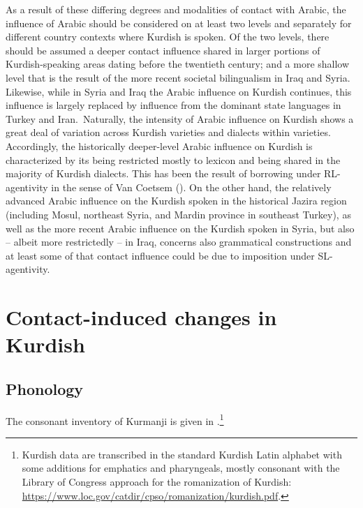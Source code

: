 \documentclass[output=paper]{langsci/langscibook}
\begin{document}
As a result of these differing degrees and modalities of contact with Arabic, the influence of Arabic should be considered on at least two levels and separately for different country contexts where Kurdish is spoken. Of the two levels, there should be assumed a deeper contact influence shared in larger portions of Kurdish-speaking areas dating before the twentieth century; and a more shallow level that is the result of the more recent societal bilingualism in Iraq and Syria. Likewise, while in Syria and Iraq the Arabic influence on Kurdish continues, this influence is largely replaced by influence from the dominant state languages in Turkey and Iran.~Naturally, the intensity of Arabic influence on Kurdish shows a great deal of variation across Kurdish varieties and dialects within varieties. Accordingly, the historically deeper-level Arabic influence on Kurdish is characterized by its being restricted mostly to lexicon and being shared in the majority of Kurdish dialects. This has been the result of borrowing under RL-agentivity in the sense of Van Coetsem (\citeyear{VanCoetsem1988,VanCoetsem2000}). On the other hand, the relatively advanced Arabic influence on the Kurdish spoken in the historical Jazira region (including Mosul, northeast Syria, and Mardin province in southeast Turkey), as well as the more recent Arabic influence on the Kurdish spoken in Syria, but also – albeit more restrictedly – in Iraq, concerns also grammatical constructions and at least some of that contact influence could be due to imposition under SL-agentivity.    

\section{Contact-induced changes in Kurdish} 

\subsection{\label{bkm:Ref14688184}Phonology}

The consonant inventory of Kurmanji is given in .\footnote{Kurdish data are transcribed in the standard Kurdish Latin alphabet with some additions for emphatics and pharyngeals, mostly consonant with the Library of Congress approach for the romanization of Kurdish: \url{https://www.loc.gov/catdir/cpso/romanization/kurdish.pdf}.} 
\end{document}
